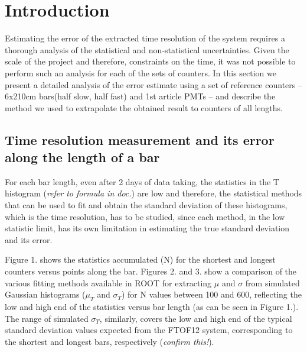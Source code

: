 \documentclass[12pt]{article}
\begin{document}
\maketitle


 
\section{Introduction}

Estimating the error of the extracted time resolution of the system requires a thorough analysis of the statistical and non-statistical uncertainties. Given the scale of the project and therefore, constraints on the time, it was not possible to perform such an analysis for each of the sets of counters. In this section we present a detailed analysis of the error estimate using a set of reference counters -- 6x210cm bars(half slow, half fast) and 1st article PMTs -- and describe the method we used to extrapolate the obtained result to counters of all lengths.

\subsection{Time resolution measurement and its error along the length of a bar}
For each bar length, even after 2 days of data taking, the statistics in the T histogram (\textit{refer to formula in doc.}) are low and therefore, the statistical methods that can be used to fit and obtain the standard deviation of these histograms, which is the time resolution, has to be studied, since each method, in the low statistic limit, has its own limitation in estimating the true standard deviation and its error. 

Figure 1. shows the statistics accumulated (N) for the shortest and longest counters versus points along the bar. Figures 2. and 3. show a comparison of the various fitting methods available in ROOT for extracting $\mu$ and $\sigma$ from simulated Gaussian histograms ($\mu_{T}$ and $\sigma_{T}$) for N values between 100 and 600, reflecting the low and high end of the statistics versus bar length (as can be seen in Figure 1.). The range of simulated $\sigma_{T}$, similarly, covers the low and high end of the typical standard deviation values expected from the FTOF12 system, corresponding to the shortest and longest bars, respectively (\textit{confirm this!}).
\end{document}
